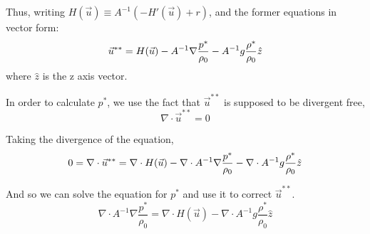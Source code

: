 \documentclass[a4paper,10pt]{article}
\begin{document}
Thus, writing $H(\vec{u})\equiv A^{-1}(-H'(\vec{u})+r)$, 
and the former equations in vector form:
\begin{equation}
      \vec{u}^{**} = H(\vec{u}) -  A^{-1}\nabla\frac{p^*}{\rho_0} - A^{-1}g\frac{\rho^*}{\rho_0}\hat{z}\\
\end{equation}
where $\hat{z}$ is the z axis vector. 

In order to calculate $p^*$, we use the fact that $\vec{u}^{**}$ is supposed to be divergent free, 
\begin{equation}
 \nabla\cdot \vec{u}^{**} = 0
\end{equation}

Taking the divergence of the equation, 
\begin{equation}
      0= \nabla\cdot \vec{u}^{**} = \nabla\cdot H(\vec{u}) -  \nabla\cdot A^{-1}\nabla\frac{p^*}{\rho_0} - \nabla\cdot A^{-1}g\frac{\rho^*}{\rho_0}\hat{z}\\
\end{equation}

And so we can solve the equation for $p^*$ and use it to correct $\vec{u}^{**}$. 
\begin{equation}
      \nabla\cdot A^{-1}\nabla\frac{p^*}{\rho_0} = \nabla\cdot H(\vec{u})  - \nabla\cdot A^{-1}g\frac{\rho^*}{\rho_0}\hat{z}
\end{equation}
\end{document}
